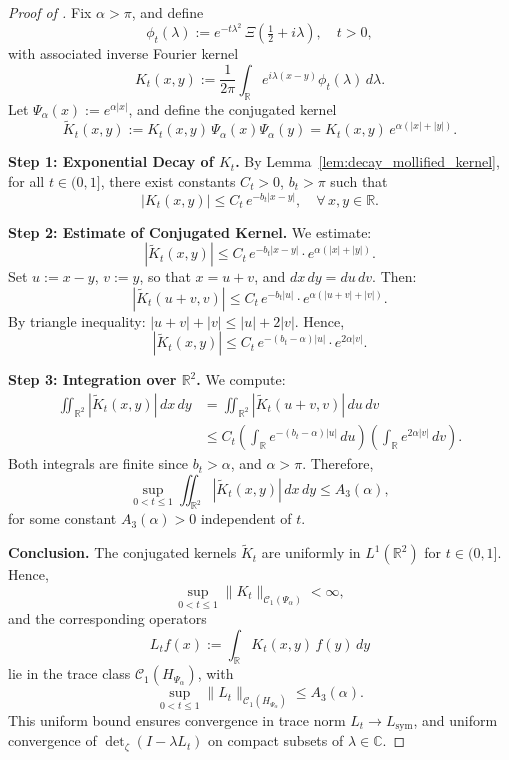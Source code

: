 \begin{proof}[Proof of ]
Fix \( \alpha > \pi \), and define
\[
\phi_t(\lambda) := e^{-t\lambda^2} \, \Xi\left( \tfrac{1}{2} + i\lambda \right), \quad t > 0,
\]
with associated inverse Fourier kernel
\[
K_t(x,y) := \frac{1}{2\pi} \int_{\mathbb{R}} e^{i\lambda(x - y)} \phi_t(\lambda)\, d\lambda.
\]
Let \( \Psi_\alpha(x) := e^{\alpha |x|} \), and define the conjugated kernel
\[
\widetilde{K}_t(x,y) := K_t(x,y)\, \Psi_\alpha(x)\Psi_\alpha(y) = K_t(x,y)\, e^{\alpha(|x| + |y|)}.
\]

\medskip
\noindent\textbf{Step 1: Exponential Decay of \( K_t \).}
By Lemma~\ref{lem:decay_mollified_kernel}, for all \( t \in (0,1] \), there exist constants \( C_t > 0 \), \( b_t > \pi \) such that
\[
|K_t(x,y)| \le C_t\, e^{-b_t |x - y|}, \quad \forall\, x, y \in \mathbb{R}.
\]

\medskip
\noindent\textbf{Step 2: Estimate of Conjugated Kernel.}
We estimate:
\[
|\widetilde{K}_t(x,y)| \le C_t\, e^{-b_t |x - y|} \cdot e^{\alpha(|x| + |y|)}.
\]
Set \( u := x - y \), \( v := y \), so that \( x = u + v \), and \( dx\,dy = du\,dv \). Then:
\[
|\widetilde{K}_t(u + v, v)| \le C_t\, e^{-b_t |u|} \cdot e^{\alpha(|u + v| + |v|)}.
\]
By triangle inequality: \( |u + v| + |v| \le |u| + 2|v| \). Hence,
\[
|\widetilde{K}_t(x,y)| \le C_t\, e^{-(b_t - \alpha)|u|} \cdot e^{2\alpha |v|}.
\]

\medskip
\noindent\textbf{Step 3: Integration over \( \mathbb{R}^2 \).}
We compute:
\[
\begin{aligned}
\iint_{\mathbb{R}^2} |\widetilde{K}_t(x,y)|\, dx\,dy
&= \iint_{\mathbb{R}^2} |\widetilde{K}_t(u + v, v)|\, du\,dv \\
&\le C_t \left( \int_{\mathbb{R}} e^{-(b_t - \alpha)|u|} \, du \right)
        \left( \int_{\mathbb{R}} e^{2\alpha |v|} \, dv \right).
\end{aligned}
\]
Both integrals are finite since \( b_t > \alpha \), and \( \alpha > \pi \). Therefore,
\[
\sup_{0 < t \le 1} \iint_{\mathbb{R}^2} |\widetilde{K}_t(x,y)|\, dx\,dy \le A_3(\alpha),
\]
for some constant \( A_3(\alpha) > 0 \) independent of \( t \).

\medskip
\noindent\textbf{Conclusion.}
The conjugated kernels \( \widetilde{K}_t \) are uniformly in \( L^1(\mathbb{R}^2) \) for \( t \in (0,1] \). Hence,
\[
\sup_{0 < t \le 1} \|K_t\|_{\mathcal{C}_1(\Psi_\alpha)} < \infty,
\]
and the corresponding operators
\[
L_t f(x) := \int_{\mathbb{R}} K_t(x,y)\, f(y)\, dy
\]
lie in the trace class \( \mathcal{C}_1(H_{\Psi_\alpha}) \), with
\[
\sup_{0 < t \le 1} \|L_t\|_{\mathcal{C}_1(H_{\Psi_\alpha})} \le A_3(\alpha).
\]
This uniform bound ensures convergence in trace norm \( L_t \to L_{\mathrm{sym}} \), and uniform convergence of \( \det_\zeta(I - \lambda L_t) \) on compact subsets of \( \lambda \in \mathbb{C} \).
\end{proof}
